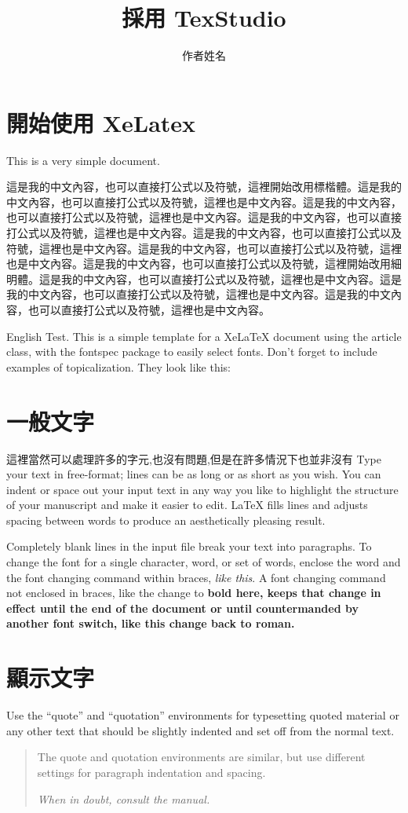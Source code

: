 \documentclass{article}
\title{採用 TexStudio}
\author{作者姓名}
\date{} %
\begin{document}
\maketitle

\section {開始使用 XeLatex}
This is a very  simple document.

這是我的中文內容，也可以直接打公式以及符號，這裡開始改用標楷體。這是我的中文內容，也可以直接打公式以及符號，這裡也是中文內容。這是我的中文內容，也可以直接打公式以及符號，這裡也是中文內容。這是我的中文內容，也可以直接打公式以及符號，這裡也是中文內容。這是我的中文內容，也可以直接打公式以及符號，這裡也是中文內容。這是我的中文內容，也可以直接打公式以及符號，這裡也是中文內容。這是我的中文內容，也可以直接打公式以及符號，這裡開始改用細明體。這是我的中文內容，也可以直接打公式以及符號，這裡也是中文內容。這是我的中文內容，也可以直接打公式以及符號，這裡也是中文內容。這是我的中文內容，也可以直接打公式以及符號，這裡也是中文內容。

English Test.  This is a simple template for a XeLaTeX document using the
article class, with the fontspec package to easily select fonts.
Don't forget to include examples of topicalization.
They look like this:

\section {一般文字}
這裡當然可以處理許多的字元,也沒有問題,但是在許多情況下也並非沒有
Type your text in free-format; lines can be as long
or as short
as you wish.
      You can indent      or space out
        your input
          text in
            any way you like to highlight the structure
      of your manuscript and make it easier to edit.
LaTeX fills lines and adjusts spacing between words to produce an
aesthetically pleasing result.

Completely blank lines in the input file break your text into
paragraphs.
To change the font for a single character, word, or set of words,
enclose the word and the font changing command within braces,
{\em like this}.
A font changing command not enclosed in braces, like the change to \bf
bold here, keeps that change in effect until the end of the document or
until countermanded by another font switch, like this change back to
\rm roman. 


\section {顯示文字}
Use the ``quote'' and ``quotation'' environments for typesetting quoted
material or any other text that should be slightly indented and set off
from the normal text.
\begin{quotation}
The quote and quotation environments are similar, but use different
settings for paragraph indentation and spacing.

\em When in doubt, consult the manual.
\end{quotation}
\end{document}
